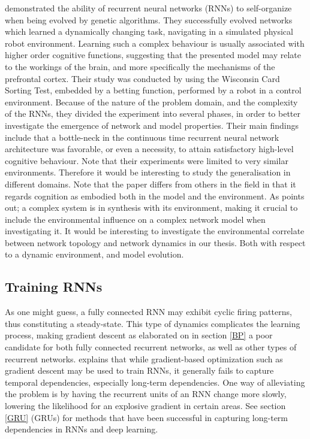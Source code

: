 \cite{Maniadakis2012} demonstrated the ability of recurrent neural networks (RNNs) to self-organize when being evolved by genetic algorithms. They successfully evolved networks which learned a dynamically changing task, navigating in a simulated physical robot environment. Learning such a complex behaviour is usually associated with higher order cognitive functions, suggesting that the presented model may relate to the workings of the brain, and more specifically the mechanisms of the prefrontal cortex.
Their study was conducted by using the Wisconsin Card Sorting Test, embedded by a betting function, performed by a robot in a control environment. Because of the nature of the problem domain, and the complexity of the RNNs, they divided the experiment into several phases, in order to better investigate the emergence of network and model properties. Their main findings include that a bottle-neck in the continuous time recurrent neural network architecture was favorable, or even a necessity, to attain satisfactory high-level cognitive behaviour. Note that their experiments were limited to very similar environments. Therefore it would be interesting to study the generalisation in different domains. Note that the paper differs from others in the field in that it regards cognition as embodied both in the model and the environment. As \cite{Bar-yam1997} points out; a complex system is in synthesis with its environment, making it crucial to include the environmental influence on a complex network model when investigating it. It would be interesting to investigate the environmental correlate between network topology and network dynamics in our thesis. Both with respect to a dynamic environment, and model evolution.

\subsection{Training RNNs}

As one might guess, a fully connected RNN may exhibit cyclic firing patterns, thus constituting a steady-state. This type of dynamics complicates the learning process, making gradient descent as elaborated on in section \ref{BP} a poor candidate for both fully connected recurrent networks, as well as other types of recurrent networks. \cite{Bengio2013b} explains that while gradient-based optimization such as gradient descent may be used to train RNNs, it generally fails to capture temporal dependencies, especially long-term dependencies. One way of alleviating the problem is by having the recurrent units of an RNN change more slowly, lowering the likelihood for an explosive gradient in certain areas. See section \ref{GRU} (GRUs) for methods that have been successful in capturing long-term dependencies in RNNs and deep learning.

